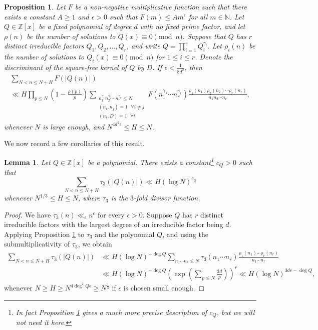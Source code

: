 \documentclass[11pt]{tran-l}
\newtheorem{lemma}[theorem]{Lemma}
\newtheorem{prop}[theorem]{Proposition}
\theoremstyle{definition}
\theoremstyle{remark}
\numberwithin{equation}{section}
\begin{document}
\begin{prop}\label{prop:nair-tenenbaum}
    Let $F$ be a non-negative multiplicative function such that there exists a constant $A\geq 1$ and $\epsilon >0$ such that $F(m)\leq Am^{\epsilon}$ for all $m\in\mathbb N$. Let $Q\in\mathbb Z[x]$ be a fixed polynomial of degree $d$ with no fixed prime factor, and let $\rho(n)$ be the number of solutions to $Q(x)\equiv 0\pmod n$. Suppose that $Q$ has $r$ distinct irreducible factors $Q_1, Q_2, \ldots, Q_r$, and write $Q = \prod_{i=1}^r Q_i^{\gamma_i}$. Let $\rho_i(n)$ be the number of solutions to $Q_i(x)\equiv 0\pmod n$ for $1\leq i\leq r$. Denote the discriminant of the square-free kernel of $Q$ by $D$. If $\epsilon<\frac{1}{8d^2}$, then 
    \begin{multline*}
        \sum_{N<n\leq N+H} F(\lvert Q(n)\rvert ) \\ \ll H\prod_{p\leq N}\left(1-\frac{\rho(p)}{p}\right) \sum_{\substack{n_1^{\gamma_1}n_2^{\gamma_2}\cdots n_r^{\gamma_r}\leq N \\ (n_i, n_j)=1 \text{ }\forall i\neq j \\ (n_i, D)=1 \text{ }\forall i}} F(n_1^{\gamma_1}\cdots n_r^{\gamma_r})\frac{\rho_1(n_1)\rho_2(n_2)\cdots \rho_r(n_r)}{n_1n_2\cdots n_r},
    \end{multline*}
    whenever $N$ is large enough, and $N^{4d^2\epsilon}\leq H\leq N$. 
\end{prop}

We now record a few corollaries of this result. 

\begin{lemma}\label{lemma:PolyBound}
    Let $Q\in\mathbb Z[x]$ be a polynomial. There exists a constant\footnote{In fact Proposition \ref{prop:nair-tenenbaum} gives a much more precise description of $c_Q$, but we will not need it here.} $c_Q>0$ such that 
    \begin{equation*}
        \sum_{N<n\leq N+H} \tau_3(\lvert Q(n)\rvert)\ll H (\log N)^{c_Q}
    \end{equation*}
    whenever $N^{1/3}\leq H \leq N$, where $\tau_3$ is the $3$-fold divisor function.
\end{lemma}

\begin{proof}
We have $\tau_3(n)\ll_{\epsilon} n^{\epsilon}$ for every $\epsilon>0$. Suppose $Q$ has $r$ distinct irreducible factors with the largest degree of an irreducible factor being $d$. Applying Proposition \ref{prop:nair-tenenbaum} to $\tau_3$ and the polynomial $Q$, and using the submultiplicativity of $\tau_3$, we obtain 
\begin{align*}
     \sum_{N<n\leq N+H} \tau_3(\lvert Q(n)\rvert) & \ll H (\log N)^{-\deg Q}\sum_{n_1\cdots n_r\leq N}\tau_3(n_1\cdots n_r)\frac{\rho_1(n_1)\cdots \rho_r(n_r)}{n_1\cdots n_r}\\ &  \ll H(\log N)^{-\deg Q} \left(\exp\left(\sum_{p\leq N} \frac{3d}{p} \right)\right)^r \ll H(\log N)^{3dr - \deg Q},
\end{align*} whenever $N\geq H\geq N^{4\deg^2 Q\epsilon}\geq N^{\frac{1}{3}}$ if $\epsilon$ is chosen small enough. 
\end{proof}
\end{document}
